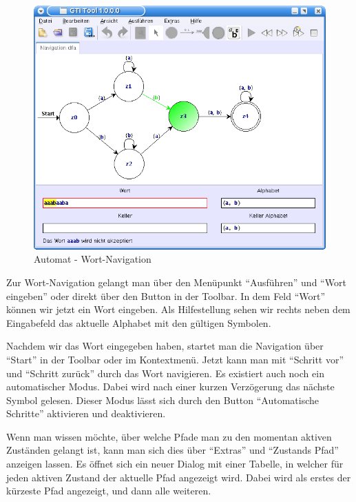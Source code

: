   \begin{figure}[h]
  \begin{center}
  \includegraphics[width=12cm]{../images/dfa_navigation.png}
  \caption{Automat - Wort-Navigation}
  \end{center}
  \end{figure}
  
  Zur Wort-Navigation gelangt man über den Menüpunkt "`Ausführen"' und "`Wort
  eingeben"' oder direkt über den Button in der Toolbar. In dem Feld
  "`Wort"' können wir jetzt ein Wort eingeben. Als Hilfestellung sehen
  wir rechts neben dem Eingabefeld das aktuelle Alphabet mit den gültigen
  Symbolen.\vspace{10pt}
  
  Nachdem wir das Wort eingegeben haben, startet man die Navigation über
  "`Start"' in der Toolbar oder im Kontextmenü. Jetzt kann man mit "`Schritt vor"' und
  "`Schritt zurück"' durch das Wort navigieren. Es existiert auch noch ein
  automatischer Modus. Dabei wird nach einer kurzen Verzögerung das nächste
  Symbol gelesen. Dieser Modus lässt sich durch den Button "`Automatische
  Schritte"' aktivieren und deaktivieren.\vspace{10pt}

  \newpage
  Wenn man wissen möchte, über welche Pfade man zu den momentan aktiven Zuständen
  gelangt ist, kann man sich dies über "`Extras"' und "`Zustands Pfad"' anzeigen
  lassen. Es öffnet sich ein neuer Dialog mit einer Tabelle, in welcher für
  jeden aktiven Zustand der aktuelle Pfad angezeigt wird. Dabei wird als erstes der
  kürzeste Pfad angezeigt, und dann alle weiteren.\vspace{10pt}
  
